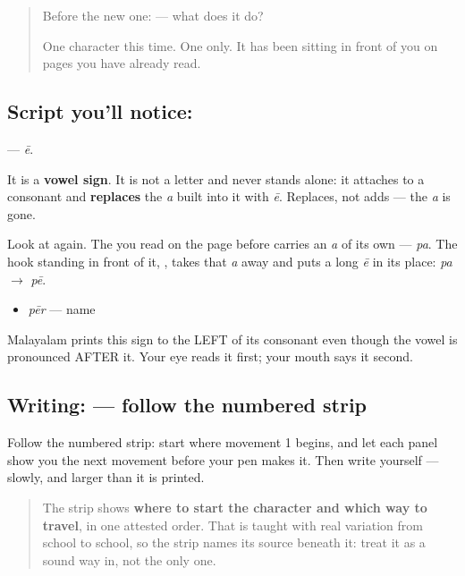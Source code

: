 \label{lesson:ML-S134-vowel-sign-ee}



\begin{quote}
Before the new one:  — what does it do?

One character this time. One only. It has been sitting in front of you on pages you have already read.
\end{quote}

\subsection*{Script you'll notice: }
\textbf{} — \emph{ē}.

It is a \textbf{vowel sign}. It is not a letter and never stands alone: it attaches to a consonant and \textbf{replaces} the \emph{a} built into it with \emph{ē}. Replaces, not adds — the \emph{a} is gone.

Look at \textbf{} again. The \textbf{} you read on the page before carries an \emph{a} of its own — \emph{pa}. The hook standing in front of it, \textbf{}, takes that \emph{a} away and puts a long \emph{ē} in its place: \emph{pa} $\to$ \emph{pē}.

\begin{itemize}
\raggedright
  \item \textbf{} \emph{pēr} — name
\end{itemize}

Malayalam prints this sign to the LEFT of its consonant even though the vowel is pronounced AFTER it. Your eye reads it first; your mouth says it second.

\subsection*{Writing:  — follow the numbered strip}

Follow the numbered strip: start where movement 1 begins, and let each panel show you the next movement before your pen makes it. Then write  yourself — slowly, and larger than it is printed.

\begin{quote}
The strip shows \textbf{where to start the character and which way to travel}, in one attested order. That is taught with real variation from school to school, so the strip names its source beneath it: treat it as a sound way in, not the only one.
\end{quote}

